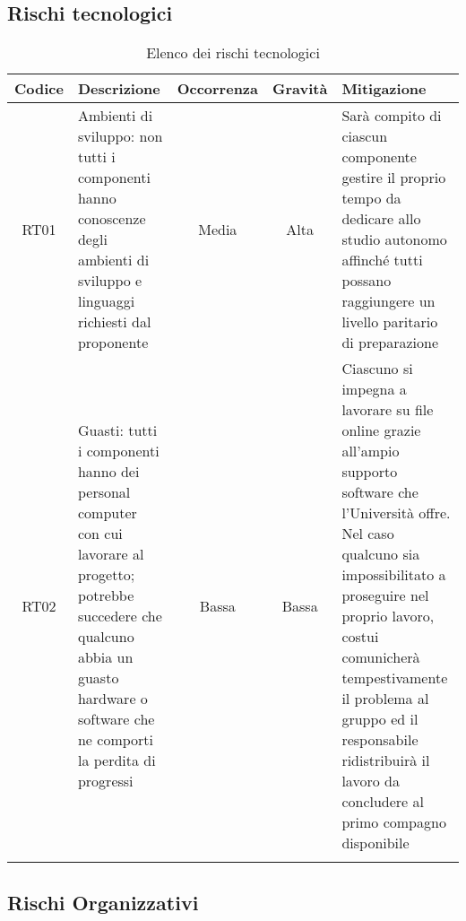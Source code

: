 \documentclass[../piano_di_progetto.tex]{subfiles}
\begin{document}
\newpage

\subsection{Rischi tecnologici}%
\label{sub:rischi_tec}

\begin{center}
	\begin{longtable}{|c|p{4.5cm}|c|c|p{4.5cm}|}
		\hline
		\rowcolor{lightgray}
		{\textbf{Codice}} & {\textbf{Descrizione}} & {\textbf{Occorrenza}} & {\textbf{Gravità}} & {\textbf{Mitigazione}}                                                                                                                                                                                                                \\

		\hline
		RT01              &
		Ambienti di sviluppo: non tutti i componenti hanno conoscenze degli ambienti di sviluppo e linguaggi richiesti dal proponente
		                  &
		Media
		                  &
		Alta
		                  &
		Sarà compito di ciascun componente gestire il proprio tempo da dedicare allo studio autonomo affinché tutti possano raggiungere un livello paritario di preparazione                                                                                                                                                            \\
		
		RT02              &
		Guasti: tutti i componenti hanno dei personal computer con cui lavorare al progetto; potrebbe succedere che qualcuno abbia un guasto hardware o software che ne comporti la perdita di progressi
		                  &
		Bassa
		                  &
		Bassa
		                  &
		Ciascuno si impegna a lavorare su file online grazie all’ampio supporto software che l’Università offre. Nel caso qualcuno sia impossibilitato a proseguire nel proprio lavoro, costui comunicherà tempestivamente il problema al gruppo ed il responsabile ridistribuirà il lavoro da concludere al primo compagno disponibile \\
		\hline
		\rowcolor{white}
		\caption{Elenco dei rischi tecnologici}
	\end{longtable}
\end{center}

\subsection{Rischi Organizzativi}%
\label{sub:rischi_org}
\end{document}
